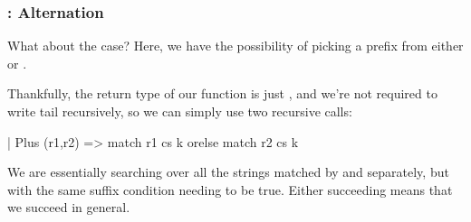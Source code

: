 \documentclass[aspectratio=169]{beamer}
\begin{document}
\begin{frame}[fragile]
  \frametitle{: Alternation}

  What about the  case? Here, we have the possibility of
  picking a prefix from either  or .

  \pause
  \vspace{\fill}

  Thankfully, the return type of our function  is just ,
  and we're not required to write  tail recursively, so we can
  simply use two recursive calls:

  \begin{codeblock}
    | Plus (r1,r2) => match r1 cs k orelse match r2 cs k
  \end{codeblock}

  \pause
  \vspace{\fill}

  We are essentially searching over all the strings matched by  and
   separately, but with the same suffix condition needing to be true.
  Either succeeding means that we succeed in general.
\end{frame}
\end{document}
